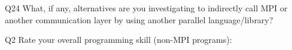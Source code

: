 \begin{description}%
\item{Q24} What, if any, alternatives are you investigating to indirectly call MPI or another communication layer by using another parallel language/library?%
\item{Q2} Rate your overall programming skill (non-MPI programs):%
\end{description}%
